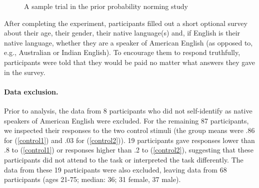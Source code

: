 \documentclass[11pt,fleqn]{article}
\newcommand{\6}{\mbox{$[\hspace*{-.6mm}[$}}
\newcommand{\9}{\mbox{$]\hspace*{-.6mm}]$}}
\begin{document}
\begin{figure}[h!]
\begin{center}
\end{center}
\caption{A sample trial in the prior probability norming study}\label{f-trial-exp1}
\end{figure}

After completing the experiment, participants filled out a short optional survey about their age, their gender, their native language(s) and, if English is their native language, whether they are a speaker of American English (as opposed to, e.g., Australian or Indian English). To encourage them to respond truthfully, participants were told that they would be paid no matter what answers they gave in the survey. 

\paragraph{Data exclusion.}
Prior to analysis, the data from 8 participants who did not self-identify as native speakers of American English were excluded. For the remaining 87 participants, we inspected their responses to the two control stimuli (the group means were .86 for (\ref{control1}) and .03 for (\ref{control2})). 19 participants gave responses lower than .8 to (\ref{control1}) or responses higher than .2 to (\ref{control2}), suggesting that these participants did not attend to the task or interpreted the task differently. The data from these 19 participants were also excluded, leaving data from 68 participants (ages 21-75; median: 36; 31 female, 37 male).  
\end{document}

